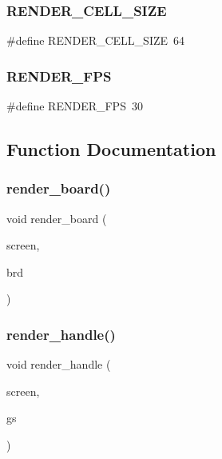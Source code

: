 \subsubsection{R\+E\+N\+D\+E\+R\+\_\+\+C\+E\+L\+L\+\_\+\+S\+I\+ZE}
{\footnotesize\ttfamily \#define R\+E\+N\+D\+E\+R\+\_\+\+C\+E\+L\+L\+\_\+\+S\+I\+ZE~64}

\mbox{\label{render_8h_a223e1142775e9fb1c5e6726f8745927d}} 
\subsubsection{R\+E\+N\+D\+E\+R\+\_\+\+F\+PS}
{\footnotesize\ttfamily \#define R\+E\+N\+D\+E\+R\+\_\+\+F\+PS~30}



\subsection{Function Documentation}
\mbox{\label{render_8h_ac4e08c5521b8cfdc4aacd662469e8caf}} 
\subsubsection{render\+\_\+board()}
{\footnotesize\ttfamily void render\+\_\+board (\begin{DoxyParamCaption}\item[{S\+D\+L\+\_\+\+Surface $\ast$}]{screen,  }\item[{const struct \textbf{ board} $\ast$}]{brd }\end{DoxyParamCaption})}

\mbox{\label{render_8h_ae6614230ba5be0480043779fa8d3f9a4}} 
\subsubsection{render\+\_\+handle()}
{\footnotesize\ttfamily void render\+\_\+handle (\begin{DoxyParamCaption}\item[{S\+D\+L\+\_\+\+Surface $\ast$}]{screen,  }\item[{const struct \textbf{ game\+\_\+state} $\ast$}]{gs }\end{DoxyParamCaption})}

